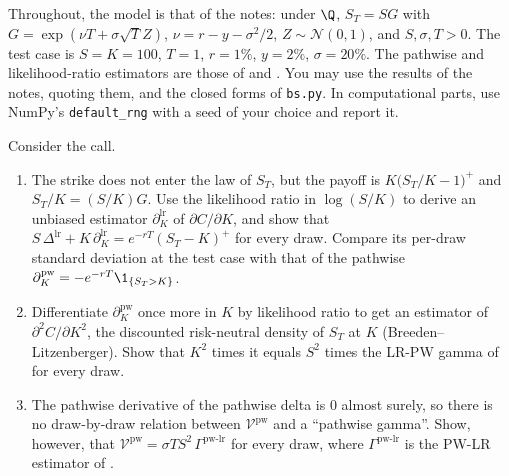 Throughout, the model is that of the notes: under $\Q$, $S_T=SG$ with
$G=\exp(\nu T+\sigma\sqrt TZ)$, $\nu=r-y-\sigma^2/2$, $Z\sim\mathcal N(0,1)$, and $S,\sigma,T>0$.
The test case is $S=K=100$, $T=1$, $r=1\%$, $y=2\%$, $\sigma=20\%$. The pathwise and
likelihood-ratio estimators are those of  and . You may
use the results of the notes, quoting them, and the closed forms of \texttt{bs.py}. In
computational parts, use NumPy's \texttt{default\_rng} with a seed of your choice and report it.

\begin{exercise}\label{ex:gr-homogeneity}
\easy Consider the call.
\begin{enumerate}[label=(\alph*)]
  \item The strike does not enter the law of $S_T$, but the payoff is
    $K\big(S_T/K-1\big)^+$ and $S_T/K=(S/K)G$. Use the likelihood ratio in $\log(S/K)$ to derive
    an unbiased estimator $\partial_K^{\mathrm{lr}}$ of $\partial C/\partial K$, and show that
    $S\,\Delta^{\mathrm{lr}}+K\,\partial_K^{\mathrm{lr}}=e^{-rT}(S_T-K)^+$ for every draw. Compare its
    per-draw standard deviation at the test case with that of the pathwise
    $\partial_K^{\mathrm{pw}}=-e^{-rT}\1_{\{S_T>K\}}$.
  \item Differentiate $\partial_K^{\mathrm{pw}}$ once more in $K$ by likelihood ratio to get an
    estimator of $\partial^2C/\partial K^2$, the discounted risk-neutral density of $S_T$ at $K$
    (Breeden--Litzenberger). Show that $K^2$ times it equals $S^2$ times the LR-PW gamma of
     for every draw.
  \item The pathwise derivative of the pathwise delta is $0$ almost surely, so there is no
    draw-by-draw relation between $\mathcal V^{\mathrm{pw}}$ and a ``pathwise gamma''. Show,
    however, that $\mathcal V^{\mathrm{pw}}=\sigma TS^2\,\Gamma^{\mathrm{pw\text{-}lr}}$ for every draw,
    where $\Gamma^{\mathrm{pw\text{-}lr}}$ is the PW-LR estimator of .
\end{enumerate}
\end{exercise}

